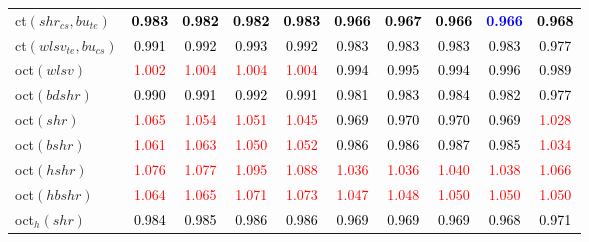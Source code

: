\begin{tabular}[t]{l|ccccccccc}
ct$(shr_{cs}, bu_{te})$ & \textcolor{black}{\textbf{0.983}} & \textcolor{black}{\textbf{0.982}} & \textcolor{black}{\textbf{0.982}} & \textcolor{black}{\textbf{0.983}} & \textcolor{black}{\textbf{0.966}} & \textcolor{black}{\textbf{0.967}} & \textcolor{black}{\textbf{0.966}} & \textcolor{blue}{\textbf{0.966}} & \textcolor{black}{\textbf{0.968}}\\
ct$(wlsv_{te}, bu_{cs})$ & \textcolor{black}{0.991} & \textcolor{black}{0.992} & \textcolor{black}{0.993} & \textcolor{black}{0.992} & \textcolor{black}{0.983} & \textcolor{black}{0.983} & \textcolor{black}{0.983} & \textcolor{black}{0.983} & \textcolor{black}{0.977}\\
oct$(wlsv)$ & \textcolor{red}{1.002} & \textcolor{red}{1.004} & \textcolor{red}{1.004} & \textcolor{red}{1.004} & \textcolor{black}{0.994} & \textcolor{black}{0.995} & \textcolor{black}{0.994} & \textcolor{black}{0.996} & \textcolor{black}{0.989}\\
oct$(bdshr)$ & \textcolor{black}{0.990} & \textcolor{black}{0.991} & \textcolor{black}{0.992} & \textcolor{black}{0.991} & \textcolor{black}{0.981} & \textcolor{black}{0.983} & \textcolor{black}{0.984} & \textcolor{black}{0.982} & \textcolor{black}{0.977}\\
oct$(shr)$ & \textcolor{red}{1.065} & \textcolor{red}{1.054} & \textcolor{red}{1.051} & \textcolor{red}{1.045} & \textcolor{black}{0.969} & \textcolor{black}{0.970} & \textcolor{black}{0.970} & \textcolor{black}{0.969} & \textcolor{red}{1.028}\\
oct$(bshr)$ & \textcolor{red}{1.061} & \textcolor{red}{1.063} & \textcolor{red}{1.050} & \textcolor{red}{1.052} & \textcolor{black}{0.986} & \textcolor{black}{0.986} & \textcolor{black}{0.987} & \textcolor{black}{0.985} & \textcolor{red}{1.034}\\
oct$(hshr)$ & \textcolor{red}{1.076} & \textcolor{red}{1.077} & \textcolor{red}{1.095} & \textcolor{red}{1.088} & \textcolor{red}{1.036} & \textcolor{red}{1.036} & \textcolor{red}{1.040} & \textcolor{red}{1.038} & \textcolor{red}{1.066}\\
oct$(hbshr)$ & \textcolor{red}{1.064} & \textcolor{red}{1.065} & \textcolor{red}{1.071} & \textcolor{red}{1.073} & \textcolor{red}{1.047} & \textcolor{red}{1.048} & \textcolor{red}{1.050} & \textcolor{red}{1.050} & \textcolor{red}{1.050}\\
oct$_h(shr)$ & \textcolor{black}{0.984} & \textcolor{black}{0.985} & \textcolor{black}{0.986} & \textcolor{black}{0.986} & \textcolor{black}{0.969} & \textcolor{black}{0.969} & \textcolor{black}{0.969} & \textcolor{black}{0.968} & \textcolor{black}{0.971}\\

\end{tabular}
